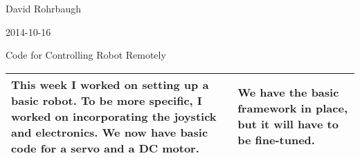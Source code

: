 David Rohrbaugh

2014-10-16

Code for Controlling Robot Remotely

\begin{tabular}{|p{5cm}|p{5cm}|}
 \hline
 This week I worked on setting up a basic robot. To be more specific, I worked on incorporating the joystick and electronics. We now have basic code for a servo and a DC motor.
 &
 We have the basic framework in place, but it will have to be fine-tuned.
 \\
 \hline
\end{tabular}
